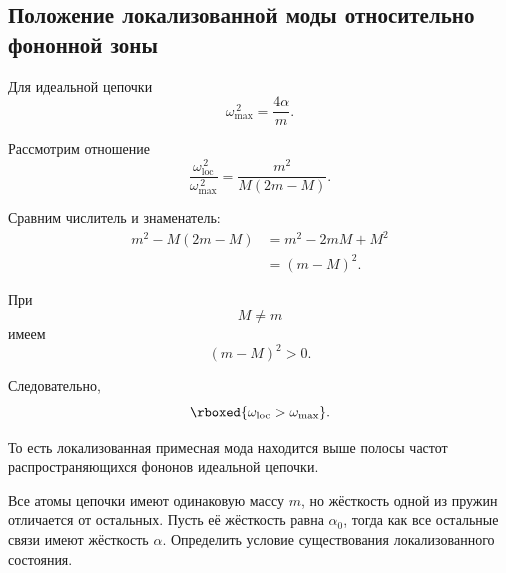 \documentclass[../final.tex]{subfiles}
\begin{document}

\subsection*{Положение локализованной моды относительно фононной зоны}

Для идеальной цепочки
%
\begin{equation*}
    \omega_{\max}^{\,2}
    =
    \frac{4\alpha}{m}.
\end{equation*}

Рассмотрим отношение
%
\begin{equation*}
    \frac{
        \omega_{\mathrm{loc}}^{\,2}
    }{
        \omega_{\max}^{\,2}
    }
    =
    \frac{
        m^2
    }{
        M(2m-M)
    }.
\end{equation*}

Сравним числитель и знаменатель:
%
\begin{align*}
    m^2
    -
    M(2m-M)
    &=
    m^2
    -
    2mM
    +
    M^2
    \\
    &=
    (m-M)^2.
\end{align*}

При
%
\begin{equation*}
    M\neq m
\end{equation*}
%
имеем
%
\begin{equation*}
    (m-M)^2>0.
\end{equation*}

Следовательно,
%
\begin{equation*}
    \rboxed{
        \omega_{\mathrm{loc}}
        >
        \omega_{\max}
    }.
\end{equation*}

То есть локализованная примесная мода находится
выше полосы частот распространяющихся фононов идеальной цепочки.




\condition
Все атомы цепочки имеют одинаковую массу $m$,
но жёсткость одной из пружин отличается от остальных.
Пусть её жёсткость равна $\alpha_0$,
тогда как все остальные связи имеют жёсткость $\alpha$.
Определить условие существования локализованного состояния.
\end{document}
